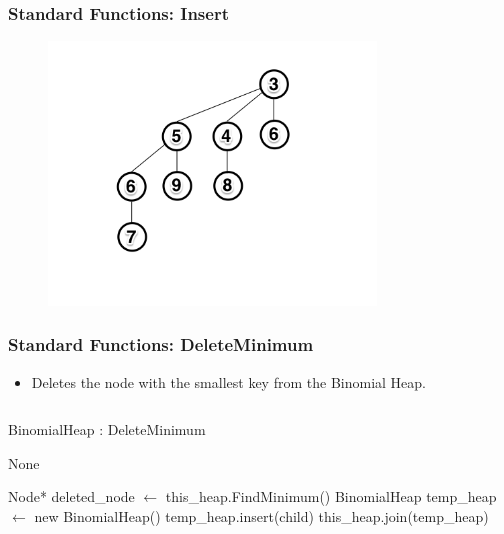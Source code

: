 \documentclass[13pt]{beamer}
\begin{document}
\begin{frame}
\frametitle{Standard Functions: Insert}

  \begin{figure}
    \includegraphics[height=7cm]{./img/insertD.png}
  \end{figure}

\end{frame}
\begin{frame}
\frametitle{Standard Functions: DeleteMinimum}
  \begin{itemize}
    \item Deletes the node with the smallest key from the Binomial Heap.
  \end{itemize}

  \begin{columns}[T] %
    \begin{column}[T]{8cm} %
        \begin{algorithm}[H]
        \small
        \caption{BinomialHeap : DeleteMinimum}
        \begin{algorithmic}
          \REQUIRE None

          \STATE Node* deleted\_node $\leftarrow$ this\_heap.FindMinimum()
          \STATE BinomialHeap temp\_heap $\leftarrow$ new BinomialHeap()
              \STATE temp\_heap.insert(child)
          \ENDFOR
          \STATE this\_heap.join(temp\_heap)
        \end{algorithmic}
        \end{algorithm}
    \end{column}
  \end{columns}
\end{frame}
\end{document}
